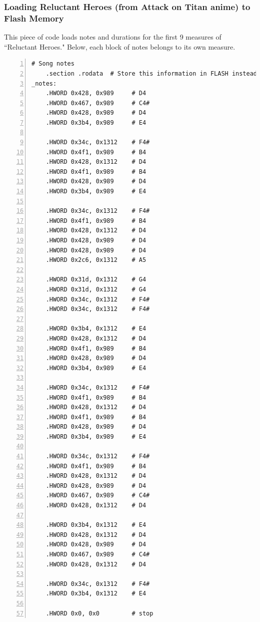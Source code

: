 \documentclass[11pt]{article}
\begin{document}
\subsubsection{Loading Reluctant Heroes (from Attack on Titan anime) to Flash Memory}

This piece of code loads notes and durations for the first 9 measures of ``Reluctant Heroes." Below, each block of notes belongs to its own measure.

\begin{lstlisting}[numbers=left,basicstyle=\footnotesize]
# Song notes
    .section .rodata  # Store this information in FLASH instead of RAM
_notes:
    .HWORD 0x428, 0x989     # D4
    .HWORD 0x467, 0x989     # C4#
    .HWORD 0x428, 0x989     # D4
    .HWORD 0x3b4, 0x989     # E4

    .HWORD 0x34c, 0x1312    # F4#
    .HWORD 0x4f1, 0x989     # B4
    .HWORD 0x428, 0x1312    # D4
    .HWORD 0x4f1, 0x989     # B4
    .HWORD 0x428, 0x989     # D4
    .HWORD 0x3b4, 0x989     # E4
    
    .HWORD 0x34c, 0x1312    # F4#
    .HWORD 0x4f1, 0x989     # B4
    .HWORD 0x428, 0x1312    # D4
    .HWORD 0x428, 0x989     # D4
    .HWORD 0x428, 0x989     # D4
    .HWORD 0x2c6, 0x1312    # A5

    .HWORD 0x31d, 0x1312    # G4
    .HWORD 0x31d, 0x1312    # G4
    .HWORD 0x34c, 0x1312    # F4#
    .HWORD 0x34c, 0x1312    # F4#

    .HWORD 0x3b4, 0x1312    # E4
    .HWORD 0x428, 0x1312    # D4
    .HWORD 0x4f1, 0x989     # B4
    .HWORD 0x428, 0x989     # D4
    .HWORD 0x3b4, 0x989     # E4

    .HWORD 0x34c, 0x1312    # F4#
    .HWORD 0x4f1, 0x989     # B4
    .HWORD 0x428, 0x1312    # D4
    .HWORD 0x4f1, 0x989     # B4
    .HWORD 0x428, 0x989     # D4
    .HWORD 0x3b4, 0x989     # E4

    .HWORD 0x34c, 0x1312    # F4#
    .HWORD 0x4f1, 0x989     # B4
    .HWORD 0x428, 0x1312    # D4
    .HWORD 0x428, 0x989     # D4
    .HWORD 0x467, 0x989     # C4#
    .HWORD 0x428, 0x1312    # D4

    .HWORD 0x3b4, 0x1312    # E4
    .HWORD 0x428, 0x1312    # D4
    .HWORD 0x428, 0x989     # D4
    .HWORD 0x467, 0x989     # C4#
    .HWORD 0x428, 0x1312    # D4

    .HWORD 0x34c, 0x1312    # F4#
    .HWORD 0x3b4, 0x1312    # E4
    
    .HWORD 0x0, 0x0         # stop
\end{lstlisting}
\end{document}
